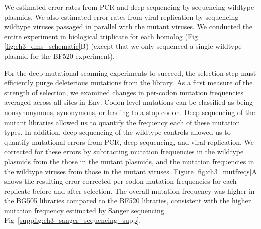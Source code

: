 \documentclass[9pt]{elife}
\begin{document}
We estimated error rates from PCR and deep sequencing by sequencing wildtype plasmids.
We also estimated error rates from viral replication by sequencing wildtype viruses passaged in parallel with the mutant viruses.
We conducted the entire experiment in biological triplicate for each homolog (Fig \ref{fig:ch3_dms_schematic}B) (except that we only sequenced a single wildtype plasmid for the BF520 experiment).


For the deep mutational-scanning experiments to succeed, the selection step must efficiently purge deleterious mutations from the library.
As a first measure of the strength of selection, we examined changes in per-codon mutation frequencies averaged across all sites in Env.
Codon-level mutations can be classified as being nonsynonymous, synonymous, or leading to a stop codon.
Deep sequencing of the mutant libraries allowed us to quantify the frequency each of these mutation types.
In addition, deep sequencing of the wildtype controls allowed us to quantify mutational errors from PCR, deep sequencing, and viral replication.
We corrected for these errors by subtracting mutation frequencies in the wildtype plasmids from the those in the mutant plasmids, and the mutation frequencies in the wildtype viruses from those in the mutant viruses.
Figure \ref{fig:ch3_mutfreqs}A shows the resulting error-corrected per-codon mutation frequencies for each replicate before and after selection.
The overall mutation frequency was higher in the BG505 libraries compared to the BF520 libraries, consistent with the higher mutation frequency estimated by Sanger sequencing Fig~\ref{suppfig:ch3_sanger_sequencing_supp}.
\end{document}

